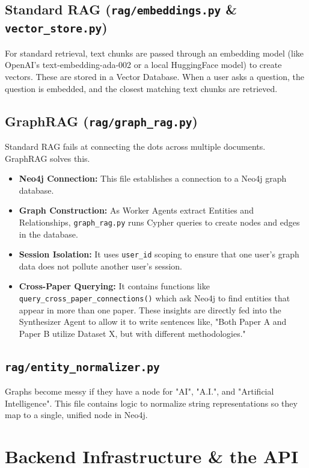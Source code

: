 \documentclass[12pt, a4paper]{report}
\begin{document}
\section{Standard RAG (\texttt{rag/embeddings.py} \& \texttt{vector\_store.py})}
For standard retrieval, text chunks are passed through an embedding model (like OpenAI's text-embedding-ada-002 or a local HuggingFace model) to create vectors. These are stored in a Vector Database. When a user asks a question, the question is embedded, and the closest matching text chunks are retrieved.

\section{GraphRAG (\texttt{rag/graph\_rag.py})}
Standard RAG fails at connecting the dots across multiple documents. GraphRAG solves this.
\begin{itemize}
    \item \textbf{Neo4j Connection:} This file establishes a connection to a Neo4j graph database.
    \item \textbf{Graph Construction:} As Worker Agents extract Entities and Relationships, \texttt{graph\_rag.py} runs Cypher queries to create nodes and edges in the database.
    \item \textbf{Session Isolation:} It uses \texttt{user\_id} scoping to ensure that one user's graph data does not pollute another user's session.
    \item \textbf{Cross-Paper Querying:} It contains functions like \texttt{query\_cross\_paper\_connections()} which ask Neo4j to find entities that appear in more than one paper. These insights are directly fed into the Synthesizer Agent to allow it to write sentences like, "Both Paper A and Paper B utilize Dataset X, but with different methodologies."
\end{itemize}

\section{\texttt{rag/entity\_normalizer.py}}
Graphs become messy if they have a node for "AI", "A.I.", and "Artificial Intelligence". This file contains logic to normalize string representations so they map to a single, unified node in Neo4j.

\newpage

\chapter{Backend Infrastructure \& the API}
\end{document}
